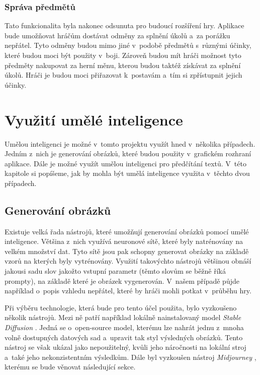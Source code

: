 \subsubsection*{Správa předmětů}
Tato funkcionalita byla nakonec odsunuta pro budoucí rozšíření hry. Aplikace bude umožňovat hráčům dostávat odměny za splnění úkolů a~za porážku nepřátel. Tyto odměny budou mimo jiné v~podobě předmětů s~různými účinky, které budou moci být použity v~boji. Zároveň budou mít hráči možnost tyto předměty nakupovat za herní měnu, kterou budou taktéž získávat za splnění úkolů. Hráči je budou moci přiřazovat k~postavám a~tím si zpřístupnit jejich účinky.

\section{Využití umělé inteligence}
Umělou inteligenci je možné v~tomto projektu využít hned v~několika případech. Jedním z~nich je generování obrázků, které budou použity v~grafickém rozhraní aplikace. Dále je možné využít umělou inteligenci pro předčítání textů. V~této kapitole si popíšeme, jak by mohla být umělá inteligence využita v~těchto dvou případech.

\subsection{Generování obrázků}\label{sec:image_generation}
Existuje velká řada nástrojů, které umožňují generování obrázků pomocí umělé inteligence. Většina z~nich využívá neuronové sítě, které byly natrénovány na velkém množství dat. Tyto sítě jsou pak schopny generovat obrázky na základě vzorů na kterých byly vytrénovány. Využití takovýchto nástrojů většinou obnáší jakousi sadu slov jakožto vstupní parametr (těmto slovům se běžně říká prompty), na základě které je obrázek vygenerován. V~našem případě půjde například o~popis vzhledu nepřátel, které by hráči mohli potkat v~průběhu hry.

Při výběru technologie, která bude pro tento účel použita, bylo vyzkoušeno několik nástrojů. Mezi ně patří například lokálně nainstalovaný model \textit{Stable Diffusion} \cite{stability_ai}. Jedná se o~open-source model, kterému lze nahrát jednu z~mnoha volně dostupných datových sad a~upravit tak styl výsledných obrázků. Tento nástroj se však ukázal jako nepoužitelný, kvůli jeho náročnosti na lokální stroj a~také jeho nekonzistentním výsledkům. Dále byl vyzkoušen nástroj \textit{Midjourney} \cite*{midjourney}, kterému se bude věnovat následující sekce.

